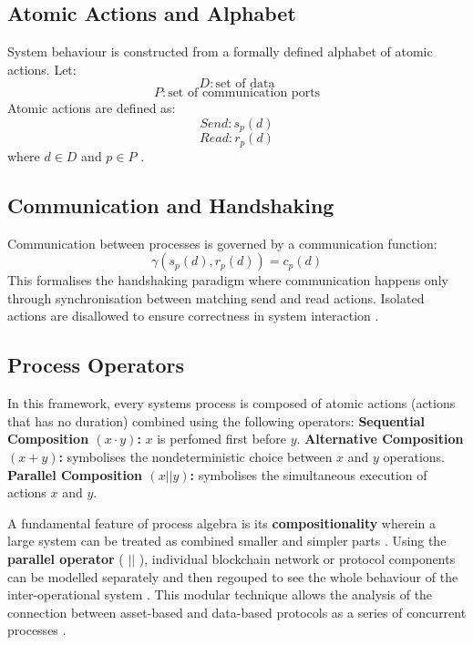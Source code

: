 \subsection{Atomic Actions and
Alphabet}\label{atomic-actions-and-alphabet}

System behaviour is constructed from a formally defined alphabet of
atomic actions. Let: \[ D: \text{set of data} \]
\[ P: \text{set of communication ports} \] Atomic actions are defined
as: \[ Send: s_p(d) \] \[ Read: r_p(d) \] where \(d \in D\) and
\(p \in P\) \citep{Vaandrager_1990}.

\subsection{Communication and
Handshaking}\label{communication-and-handshaking}

Communication between processes is governed by a communication function:
\[ \gamma(s_p(d), r_p(d)) = c_p(d) \] This formalises the handshaking
paradigm where communication happens only through synchronisation
between matching send and read actions. Isolated actions are disallowed
to ensure correctness in system interaction \citep{Vaandrager_1990}.

\subsection{Process Operators}\label{process-operators}

In this framework, every system\textquotesingle s process is composed of
atomic actions (actions that has no duration) combined using the
following operators: \textbf{Sequential Composition \(( x \cdot y )\):}
\(x\) is perfomed first before \(y\). \textbf{Alternative Composition
\(( x + y )\):} symbolises the nondeterministic choice between \(x\) and
\(y\) operations. \textbf{Parallel Composition \(( x || y )\):}
symbolises the simultaneous execution of actions \(x\) and \(y\).

A fundamental feature of process algebra is its
\textbf{compositionality} wherein a large system can be treated as
combined smaller and simpler parts \citep{fokkink2007introduction}.
Using the \textbf{parallel operator} ( \(||\) ), individual blockchain
network or protocol components can be modelled separately and then
regouped to see the whole behaviour of the inter-operational system
\citep{fokkink2007introduction}. This modular technique allows the
analysis of the connection between asset-based and data-based protocols
as a series of concurrent processes \citep{fokkink2007introduction}.

